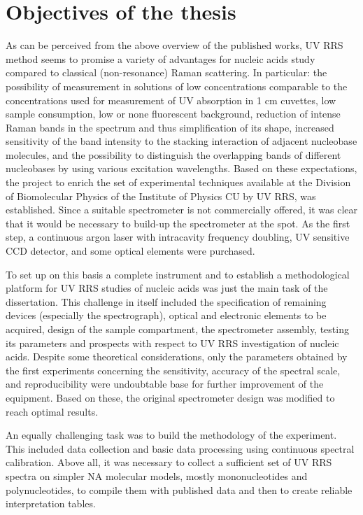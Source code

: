 \chapter{Objectives of the thesis}
\label{objectives}

As can be perceived from the above overview of the published works, UV RRS
method seems to promise a variety of advantages for nucleic acids study
compared to classical (non-resonance) Raman scattering.
In particular: the possibility of measurement in solutions of low
concentrations comparable to the concentrations used for measurement of
UV absorption in 1 cm cuvettes, low sample consumption, low or none fluorescent
background, reduction of intense Raman bands in the spectrum and thus
simplification of its shape, increased sensitivity of the band intensity to the
stacking interaction of adjacent nucleobase molecules, and the possibility to
distinguish the overlapping bands of different nucleobases by using various
excitation wavelengths.
Based on these expectations, the project to enrich the set of experimental
techniques available at the Division of Biomolecular Physics of the Institute
of Physics CU by UV RRS, was established. Since a suitable spectrometer is not
commercially offered, it was clear that it would be necessary to build-up the
spectrometer at the spot.
As the first step, a continuous argon laser with intracavity frequency
doubling, UV sensitive CCD detector, and some optical elements were purchased.

To set up on this basis a complete instrument and to establish a methodological
platform for UV RRS studies of nucleic acids was just the main task of the
dissertation.
This challenge in itself included the specification of remaining devices
(especially the spectrograph), optical and electronic elements to be acquired,
design of the sample compartment, the spectrometer assembly, testing its
parameters and prospects with respect to UV RRS investigation of nucleic acids.
Despite some theoretical considerations, only the parameters obtained by the
first experiments concerning the sensitivity, accuracy of the spectral scale,
and reproducibility were undoubtable base for further improvement of the
equipment.
Based on these, the original spectrometer design was modified to reach optimal
results.

An equally challenging task was to build the methodology of the experiment.
This included data collection and basic data processing using continuous
spectral calibration.
Above all, it was necessary to collect a sufficient set of UV RRS spectra on
simpler NA molecular models, mostly mononucleotides and polynucleotides, to
compile them with published data and then to create reliable interpretation
tables.

